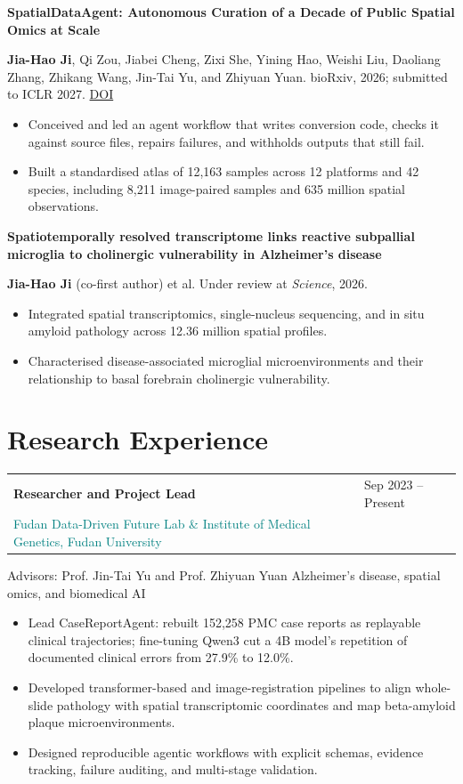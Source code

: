 \documentclass[10pt,a4paper]{article}
\makeatletter
\newcommand{\roleline}[3]{%
  \begin{tabularx}{\textwidth}{@{}>{\RaggedRight\arraybackslash}X>{\RaggedLeft\arraybackslash}p{32mm}@{}}
    \textbf{#1} & \textcolor{Muted}{#3}\\[-0.1em]
    \textcolor{Teal}{#2} &
  \end{tabularx}
}
\newcommand{\pubtitle}[1]{\textbf{\color{Ink}#1}}
\newcommand{\meta}[1]{{\small\color{Muted}#1}}
\newcommand{\cvitem}[1]{\item {#1}}
\newenvironment{cvitems}{%
  \begin{itemize}[leftmargin=1.15em,itemsep=0.17em,topsep=0.25em,parsep=0pt,partopsep=0pt,label=\textcolor{Teal}{\raisebox{0.15ex}{\scriptsize\textbullet}}]
}{\end{itemize}}
\makeatother
\begin{document}
\vspace{0.28em}
\pubtitle{SpatialDataAgent: Autonomous Curation of a Decade of Public Spatial Omics at Scale}\par
\meta{\textbf{Jia-Hao Ji}, Qi Zou, Jiabei Cheng, Zixi She, Yining Hao, Weishi Liu, Daoliang Zhang, Zhikang Wang, Jin-Tai Yu, and Zhiyuan Yuan. bioRxiv, 2026; submitted to ICLR 2027. \href{https://doi.org/10.64898/2026.05.27.727615}{DOI}}
\begin{cvitems}
  \cvitem{Conceived and led an agent workflow that writes conversion code, checks it against source files, repairs failures, and withholds outputs that still fail.}
  \cvitem{Built a standardised atlas of 12,163 samples across 12 platforms and 42 species, including 8,211 image-paired samples and 635 million spatial observations.}
\end{cvitems}

\vspace{0.28em}
\pubtitle{Spatiotemporally resolved transcriptome links reactive subpallial microglia to cholinergic vulnerability in Alzheimer's disease}\par
\meta{\textbf{Jia-Hao Ji} (co-first author) et al. Under review at \textit{Science}, 2026.}
\begin{cvitems}
  \cvitem{Integrated spatial transcriptomics, single-nucleus sequencing, and in situ amyloid pathology across 12.36 million spatial profiles.}
  \cvitem{Characterised disease-associated microglial microenvironments and their relationship to basal forebrain cholinergic vulnerability.}
\end{cvitems}

\section*{Research Experience}

\roleline{Researcher and Project Lead}{Fudan Data-Driven Future Lab \& Institute of Medical Genetics, Fudan University}{Sep 2023 -- Present}
\meta{Advisors: Prof. Jin-Tai Yu and Prof. Zhiyuan Yuan \textbar{} Alzheimer's disease, spatial omics, and biomedical AI}
\begin{cvitems}
  \cvitem{Lead CaseReportAgent: rebuilt 152,258 PMC case reports as replayable clinical trajectories; fine-tuning Qwen3 cut a 4B model's repetition of documented clinical errors from 27.9\% to 12.0\%.}
  \cvitem{Developed transformer-based and image-registration pipelines to align whole-slide pathology with spatial transcriptomic coordinates and map beta-amyloid plaque microenvironments.}
  \cvitem{Designed reproducible agentic workflows with explicit schemas, evidence tracking, failure auditing, and multi-stage validation.}
\end{cvitems}
\end{document}
